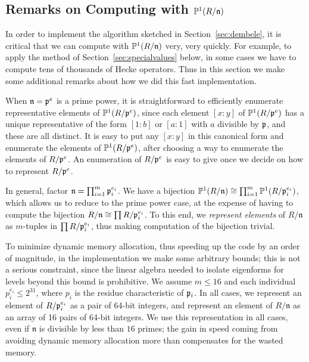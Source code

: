 \documentclass{amsart}
\newcommand{\n}{\mathfrak{n}}
\begin{document}
\subsection{Remarks on Computing with $\P^1(R/\n)$}

In order to implement the algorithm sketched in
Section~\ref{sec:dembele}, it is critical that we can compute with
$\P^1(R/\n)$ very, very quickly.  For example, to apply the method of
Section~\ref{sec:specialvalues} below, in some cases we have to
compute tens of thousands of Hecke operators.  Thus in this section we
make some additional remarks about how we did this fast
implementation.

When $\n=\p^e$ is a prime power, it is
straightforward to efficiently enumerate representative elements of
$\mathbb{P}^1(R/\mathfrak{p}^e)$, since each element $[x:y]$ of $\mathbb{P}^1(R/\mathfrak{p}^e)$ has a
unique representative of the form $[1:b]$ or $[a:1]$ with $a$
divisible by $\mathfrak{p}$, and these are all distinct.  It is easy 
to put  any $[x:y]$ 
in this canonical form and enumerate the elements of $\mathbb{P}^1(R/\mathfrak{p}^e)$, after
choosing a way to enumerate the elements of $R/\mathfrak{p}^e$.
An enumeration of $R/\mathfrak{p}^e$ is easy to give
once we decide on how to represent $R/\mathfrak{p}^e$.

In general, factor $\n = \prod_{i=1}^m \p_i^{e_i}$. 
We have a bijection $\P^1(R/\n) \isom \prod_{i=1}^m
\P^1(R/\p_i^{e_i})$, which allows us to reduce to the prime power
case, at the expense of having to compute the bijection 
$R/\n \isom \prod R/\p_i^{e_i}$.
To this end, we {\em represent elements} of $R/\n$ as
$m$-tuples in $\prod R/\mathfrak{p}_i^{e_i}$, thus making
computation of the bijection trivial.  

To minimize dynamic memory allocation, thus speeding up the
code by an order of magnitude, in the implementation
we make some arbitrary
bounds; this is not a serious constraint, since the linear algebra
needed to isolate eigenforms for levels beyond this bound is
prohibitive. We assume $m\leq 16$ and each individual 
$p_i^{e_i}\leq 2^{31}$, where $p_i$ is the residue characteristic of $\mathfrak{p}_i$.  
In all cases, we represent an
element of $R/\mathfrak{p}_i^{e_i}$ as a pair of  64-bit integers, and
represent an element of $R/\n$ as an array of 16 pairs of 64-bit
integers. We use this representation in all cases, even if $\n$ is
divisible by less than $16$ primes; the gain in speed coming
from avoiding dynamic memory allocation more than compensates for the
wasted memory.
\end{document}
